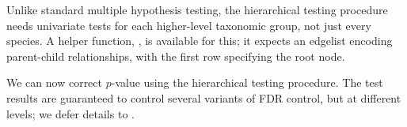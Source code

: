 Unlike standard multiple hypothesis testing, the hierarchical testing
procedure needs univariate tests for each higher-level taxonomic
group, not just every species. A helper function,
, is available for this; it expects an edgelist
encoding parent-child relationships, with the first row specifying the
root node.

\begin{knitrout}
\color{fgcolor}\begin{kframe}
\begin{alltt}
 \hlkwb{<-} \hlopt{$}
 \hlkwb{<-} 
 \hlkwb{<-} \hlstd{el0[}\hlopt{:}\hlstd{, ]}
 \hlkwb{<-}  \hlstd{(}\hlopt{$}
\hlstd{el[,} \hlstd{]} \hlkwb{<-} \hlstd{el_names[el0[,} \hlstd{]]}
\hlstd{el[,} \hlstd{]} \hlkwb{<-} \hlstd{el_names[}\hlstd{(el0[,} \hlstd{])]}
 \hlkwb{<-}  \hlopt{$}
\end{alltt}
\end{kframe}
\end{knitrout}

We can now correct $p$-value using the hierarchical testing
procedure. The test results are guaranteed to control several
variants of FDR control, but at different levels; we defer
details to \cite{benjamini2003hierarchical, benjamini2014selective,
  sankaran2014structssi}.

